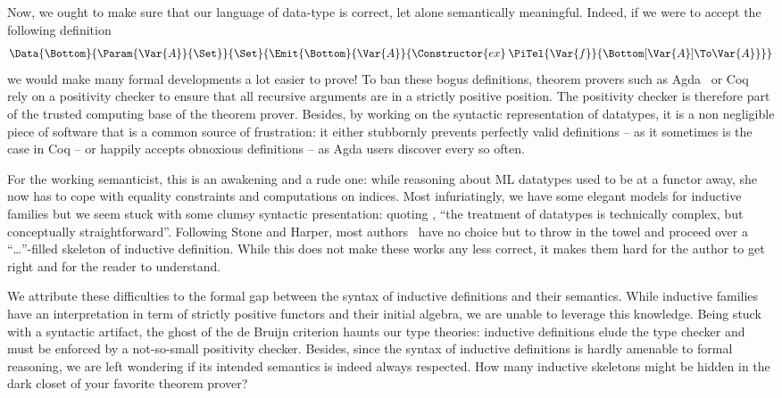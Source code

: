 \documentclass{scrartcl}
\theoremstyle{plain}
\theoremstyle{definition}
\begin{document}
Now, we ought to make sure that our language of data-type is correct,
let alone semantically meaningful. Indeed, if we were to accept the
following definition
\[
\Data{\Bottom}
     {\Param{\Var{A}}{\Set}}
     {\Set}{
\Emit{\Bottom}{\Var{A}}{\Constructor{ex}\: \PiTel{\Var{f}}{\Bottom[\Var{A}] \To \Var{A}}}}
\]
we would make many formal developments a lot easier to prove! To ban
these bogus definitions, theorem provers such as
Agda~\citep{norell:agda} or Coq~\citep{coq} rely on a positivity
checker to ensure that all recursive arguments are in a
strictly positive position.
The positivity checker is therefore part of the trusted computing base
of the theorem prover. Besides, by working on the syntactic
representation of datatypes, it is a non negligible piece of software
that is a common source of frustration: it either stubbornly prevents
perfectly valid definitions -- as it sometimes is the case in Coq --
or happily accepts obnoxious definitions -- as Agda users discover
every so often.



For the working semanticist, this is an awakening and a rude one:
while reasoning about ML datatypes used to be at a functor away, she
now has to cope with equality constraints and computations on
indices. Most infuriatingly, we have some elegant models for inductive
families but we seem stuck with some clumsy syntactic presentation:
quoting \citet{harper:elaboration}, ``the treatment of datatypes is
technically complex, but conceptually straightforward''. Following
Stone and Harper, most authors~\citep{coen:refinement,luo:utt,
  mcbride:construction-constructor} have no choice but to throw in the
towel and proceed over a ``\ldots''-filled skeleton of inductive
definition. While this does not make these works any less correct, it
makes them hard for the author to get right and for the reader to
understand.



We attribute these difficulties to the formal gap between the syntax
of inductive definitions and their semantics. While inductive families
have an interpretation in term of strictly positive functors and their
initial algebra, we are unable to leverage this knowledge. Being stuck
with a syntactic artifact, the ghost of the de Bruijn criterion haunts
our type theories: inductive definitions elude the type checker and
must be enforced by a not-so-small positivity checker. Besides, since
the syntax of inductive definitions is hardly amenable to formal
reasoning, we are left wondering if its intended semantics is indeed
always respected. How many inductive skeletons might be hidden in the
dark closet of your favorite theorem prover?
\end{document}
